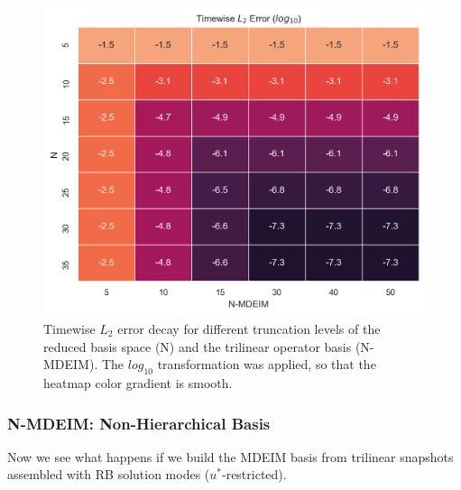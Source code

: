 \documentclass[../../thesis.tex]{subfiles}
\begin{document}
\begin{figure}
    \centering
    \includegraphics[width=1\columnwidth]{research_project/piston/figures/mdeim_certification/error_decay_heatmap.png}
    \caption{Timewise $L_2$ error decay for different truncation levels 
    of the reduced basis space (N) 
    and the trilinear operator basis (N-MDEIM).
    The $log_{10}$ transformation was applied, so that the heatmap color gradient is smooth.}
    \label{fig:nonlinear_error_decay_heatmap}
\end{figure}

\subsubsection{N-MDEIM: Non-Hierarchical Basis}
\label{sec:us_non-hierarchical_basis}
Now we see what happens if we build the MDEIM basis 
from trilinear snapshots assembled with RB solution modes 
($u^{*}$-restricted).
\end{document}
